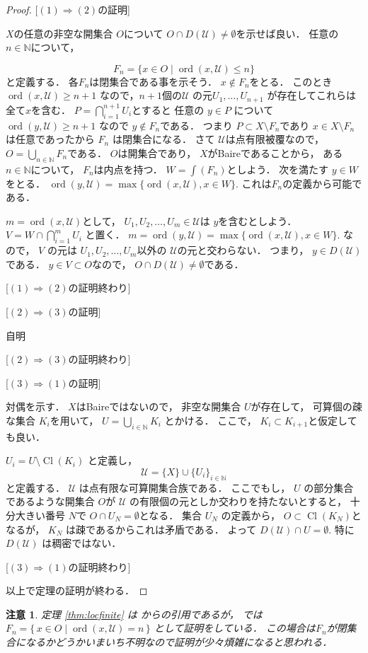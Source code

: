 \documentclass[leqno, 12pt]{jsarticle}
\newtheorem*{rmk}{注意}
\newcommand{\To}{\Longrightarrow}
\newcommand{\nn}{\mathbb{N}}
\DeclareMathOperator{\cl}{Cl}
\DeclareMathOperator{\ord}{ord}
\newcommand{\mycal}[1]{\mathcal{#1}}
\newcommand{\mydd}[1]{D(#1)}
\begin{document}
\begin{proof}

[$(1)\To (2)$の証明]


$X$の任意の非空な開集合
$O$について
$O\cap \mydd{\mycal{U}}
\neq \emptyset$を示せば良い．
任意の$n\in \nn$について，

\[
F_{n}=\{x\in O\mid \ord(x, \mycal{U})\le n \}
\]
と定義する．
各$F_{n}$は閉集合である事を示そう．
$x\not \in F_{n}$をとる．
このとき
$\ord(x, \mycal{U})\ge n+1$
なので，$n+1$個の$\mathcal{U}$
の元$U_{1}, \dots, U_{n+1}$
が存在してこれらは全て$x$を含む．
$P=\bigcap_{i=1}^{n+1}U_{i}$とすると
任意の
$y\in P$
について
$\ord(y, \mycal{U})\ge n+1$
なので
$y\not\in F_{n}$である．
つまり
$P\subset X\setminus F_{n}$であり
$x\in X\setminus F_{n}$
は任意であったから
$F_{n}$
は閉集合になる．
さて
$\mycal{U}$は点有限被覆なので，
$O=\bigcup_{n\in \nn}F_{n}$である．
$O$は開集合であり，
$X$がBaireであることから，
ある$n\in \nn$について，
$F_{n}$は内点を持つ．
$W=\int (F_{n})$としよう．
次を満たす
$y\in W$をとる．
$\ord(y, \mycal{U})=
\max\{\ord(x, \mycal{U}), x\in W\}$. 
これは$F_{n}$の定義から可能である．

$m=\ord(x, \mycal{U})$として，
$U_{1}, U_{2}, \dots, U_{m}\in \mycal{U}$は
$y$を含むとしよう．
$V=W\cap \bigcap_{i=1}^mU_{i}$
と置く．
$m=\ord(y, \mycal{U})=
\max\{\ord(x, \mycal{U}), x\in W\}$. 
なので，
$V$
の元は
$U_{1}, U_{2}, \dots, U_{m}$以外の
$\mycal{U}$の元と交わらない．
つまり，
$y\in \mydd{\mycal{U}}$である．
$y\in V \subset O$なので，
$O\cap \mydd{\mycal{U}}\neq \emptyset$である．


[$(1)\To (2)$の証明終わり]


[$(2)\To (3)$の証明]

自明


[$(2)\To (3)$の証明終わり]


[$(3)\To (1)$の証明]

対偶を示す．
$X$はBaireではないので，
非空な開集合
$U$が存在して，
可算個の疎な集合
$K_{i}$を用いて，
$U=\bigcup_{i\in \nn}K_{i}$
とかける．
ここで，
$K_{i}\subset K_{i+1}$と仮定しても良い．

$U_{i}=U\setminus \cl(K_i)$
と定義し，
\[
\mathcal{U}=\{X\}\cup \{U_{i}\}_{i\in \nn}
\]
と定義する．
$\mycal{U}$
は点有限な可算開集合族である．
ここでもし，
$U$
の部分集合であるような開集合
$O$が
$\mycal{U}$
の有限個の元としか交わりを持たないとすると，
十分大きい番号
$N$で
$O\cap U_{N}=\emptyset $となる．
集合
$U_{N}$
の定義から，
$O\subset \cl(K_{N})$となるが，
$K_{N}$
は疎であるからこれは矛盾である．
よって
$\mydd{\mycal{U}}\cap U=\emptyset$. 
特に
$\mydd{\mycal{U}}$
は稠密ではない．

[$(3)\To (1)$の証明終わり]

以上で定理の証明が終わる．
\end{proof}
\begin{rmk}
定理
\ref{thm:locfinite}
は
\cite{1}
からの引用であるが，
\cite{1}では
$F_{n}=\{\, x\in O\mid \ord(x, \mycal{U})=n\, \}$
として証明をしている．
この場合は$F_{n}$が閉集合になるかどうかいまいち不明なので証明が少々煩雑になると思われる．
\end{rmk}
\end{document}
